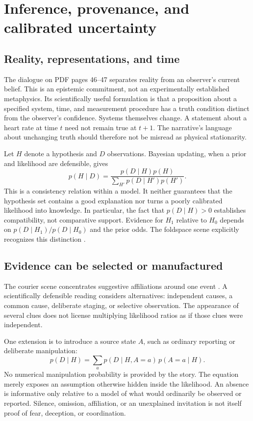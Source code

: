 \section{Inference, provenance, and calibrated uncertainty}
\subsection{Reality, representations, and time}
The dialogue on PDF pages 46--47 separates reality from an observer's current belief. This is an epistemic commitment, not an experimentally established metaphysics. Its scientifically useful formulation is that a proposition about a specified system, time, and measurement procedure has a truth condition distinct from the observer's confidence. Systems themselves change. A statement about a heart rate at time $t$ need not remain true at $t+1$. The narrative's language about unchanging truth should therefore not be misread as physical stationarity.

Let $H$ denote a hypothesis and $D$ observations. Bayesian updating, when a prior and likelihood are defensible, gives
\begin{equation}
 p(H\mid D)=\frac{p(D\mid H)p(H)}{\sum_{H'}p(D\mid H')p(H')}.
 \label{eq:bayes}
\end{equation}
This is a consistency relation within a model. It neither guarantees that the hypothesis set contains a good explanation nor turns a poorly calibrated likelihood into knowledge. In particular, the fact that $p(D\mid H)>0$ establishes compatibility, not comparative support. Evidence for $H_1$ relative to $H_0$ depends on $p(D\mid H_1)/p(D\mid H_0)$ and the prior odds. The foldspace scene explicitly recognizes this distinction .

\subsection{Evidence can be selected or manufactured}
The courier scene concentrates suggestive affiliations around one event . A scientifically defensible reading considers alternatives: independent causes, a common cause, deliberate staging, or selective observation. The appearance of several clues does not license multiplying likelihood ratios as if those clues were independent.

One extension is to introduce a source state $A$, such as ordinary reporting or deliberate manipulation:
\begin{equation}
 p(D\mid H)=\sum_a p(D\mid H,A=a)\,p(A=a\mid H).
\end{equation}
No numerical manipulation probability is provided by the story. The equation merely exposes an assumption otherwise hidden inside the likelihood. An absence is informative only relative to a model of what would ordinarily be observed or reported. Silence, omission, affiliation, or an unexplained invitation is not itself proof of fear, deception, or coordination.

